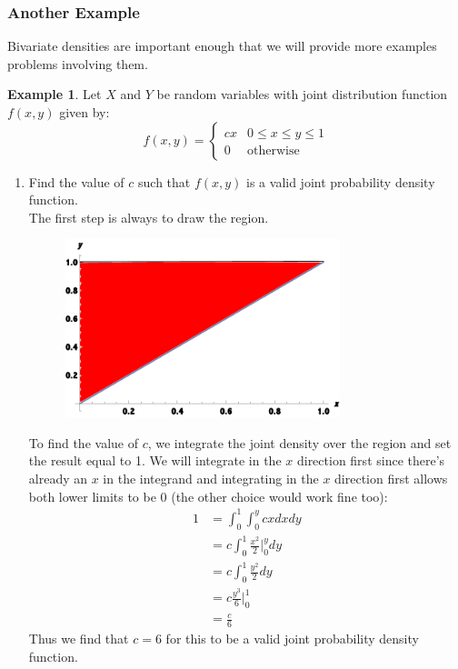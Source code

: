 \documentclass[12pt]{article}
\theoremstyle{definition}
\newtheorem*{example}{Example}
\theoremstyle{remark}
\begin{document}
\subsubsection{Another Example}
Bivariate densities are important enough that we will provide more examples problems involving them.

\begin{example}Let $X$ and $Y$ be random variables with joint distribution function $f(x, y)$ given by:
\[
f(x, y) = \begin{cases} 
      c x  & 0 \leq x \leq y \leq 1 \\
      0 & \textrm{otherwise}
   \end{cases}
\]

\begin{enumerate}
\item Find the value of $c$ such that $f(x, y)$ is a valid joint probability density function.\\

The first step is always to draw the region.
\begin{figure}[H]
\centering
\includegraphics[width=8cm]{region2.pdf}
\end{figure}
To find the value of $c$, we integrate the joint density over the region and set the result equal to 1. We will integrate in the $x$ direction first since there's already an $x$ in the integrand and integrating in the $x$ direction first allows both lower limits to be 0 (the other choice would work fine too):
\begin{align*}
1 &= \int_0^1 \int_0^y c x dx dy \\
&= c \int_0^1 \frac{x^2}{2}\Bigr|_0^y dy \\
&= c \int_0^1 \frac{y^2}{2} dy \\
&= c \frac{y^3}{6}\Bigr|_0^1 \\
&= \frac{c}{6}
\end{align*}
Thus we find that $c = 6$ for this to be a valid joint probability density function.


\end{enumerate}
\end{example}
\end{document}
